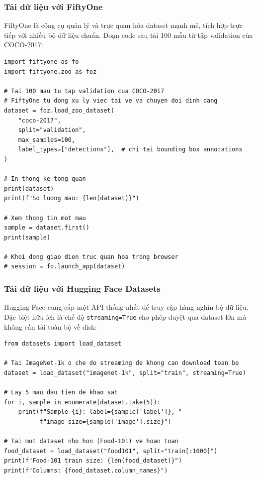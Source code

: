 \subsubsection{Tải dữ liệu với FiftyOne}

FiftyOne là công cụ quản lý và trực quan hóa dataset mạnh mẽ, tích hợp trực tiếp với nhiều bộ dữ liệu chuẩn. Đoạn code sau tải 100 mẫu từ tập validation của COCO-2017:

\begin{verbatim}
import fiftyone as fo
import fiftyone.zoo as foz

# Tai 100 mau tu tap validation cua COCO-2017
# FiftyOne tu dong xu ly viec tai ve va chuyen doi dinh dang
dataset = foz.load_zoo_dataset(
    "coco-2017",
    split="validation",
    max_samples=100,
    label_types=["detections"],  # chi tai bounding box annotations
)

# In thong ke tong quan
print(dataset)
print(f"So luong mau: {len(dataset)}")

# Xem thong tin mot mau
sample = dataset.first()
print(sample)

# Khoi dong giao dien truc quan hoa trong browser
# session = fo.launch_app(dataset)
\end{verbatim}

\subsubsection{Tải dữ liệu với Hugging Face Datasets}

Hugging Face cung cấp một API thống nhất để truy cập hàng nghìn bộ dữ liệu. Đặc biệt hữu ích là chế độ \texttt{streaming=True} cho phép duyệt qua dataset lớn mà không cần tải toàn bộ về disk:

\begin{verbatim}
from datasets import load_dataset

# Tai ImageNet-1k o che do streaming de khong can download toan bo
dataset = load_dataset("imagenet-1k", split="train", streaming=True)

# Lay 5 mau dau tien de khao sat
for i, sample in enumerate(dataset.take(5)):
    print(f"Sample {i}: label={sample['label']}, "
          f"image_size={sample['image'].size}")

# Tai mot dataset nho hon (Food-101) ve hoan toan
food_dataset = load_dataset("food101", split="train[:1000]")
print(f"Food-101 train size: {len(food_dataset)}")
print(f"Columns: {food_dataset.column_names}")
\end{verbatim}

